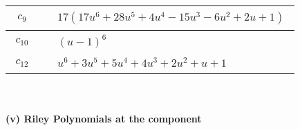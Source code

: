 \documentclass[1p]{elsarticle_modified}
\theoremstyle{definition}
\begin{document}
\begin{tabular}{m{50pt}|m{274pt}}
\hline $$\begin{aligned}c_{9}\end{aligned}$$&$\begin{aligned}
&17(17 u^6+28 u^5+4 u^4-15 u^3-6 u^2+2 u+1)
\end{aligned}$\\
\hline $$\begin{aligned}c_{10}\end{aligned}$$&$\begin{aligned}
&(u-1)^6
\end{aligned}$\\
\hline $$\begin{aligned}c_{12}\end{aligned}$$&$\begin{aligned}
&u^6+3 u^5+5 u^4+4 u^3+2 u^2+u+1
\end{aligned}$\\
\hline
\end{tabular}\\~\\
\newpage\renewcommand{\arraystretch}{1}
\flushleft \textbf{(v) Riley Polynomials at the component}\newline \\
\end{document}
